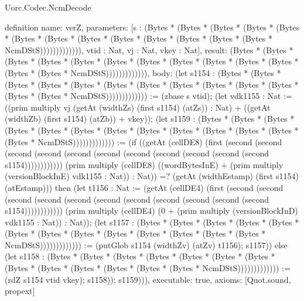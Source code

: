 \begin{lexlean}{Uorc.Codec.NcmDecode}
\begin{semanticmodule}
definition{
  name: verZ,
  parameters: [s : (Bytes * (Bytes * (Bytes * (Bytes * (Bytes * (Bytes * (Bytes * (Bytes * (Bytes * (Bytes * (Bytes * (Bytes * (Bytes * NcmDStS))))))))))))), vtid : Nat, vj : Nat, vkey : Nat],
  result: (Bytes * (Bytes * (Bytes * (Bytes * (Bytes * (Bytes * (Bytes * (Bytes * (Bytes * (Bytes * (Bytes * (Bytes * (Bytes * NcmDStS))))))))))))),
  body: (let s1154 : (Bytes * (Bytes * (Bytes * (Bytes * (Bytes * (Bytes * (Bytes * (Bytes * (Bytes * (Bytes * (Bytes * (Bytes * (Bytes * NcmDStS))))))))))))) := (zbase s vtid); (let vdk1155 : Nat := ((prim multiply vj (getAt (widthZs) (first s1154) (atZs)) : Nat) + ((getAt (widthZb) (first s1154) (atZb)) + vkey)); (let s1159 : (Bytes * (Bytes * (Bytes * (Bytes * (Bytes * (Bytes * (Bytes * (Bytes * (Bytes * (Bytes * (Bytes * (Bytes * (Bytes * NcmDStS))))))))))))) := (if ((getAt (cellDE8) (first (second (second (second (second (second (second (second (second (second (second (second s1154)))))))))))) (prim multiply (cellDE8) ((wordBytesInE) + (prim multiply (versionBlockInE) vdk1155 : Nat)) : Nat)) =? (getAt (widthEstamp) (first s1154) (atEstamp))) then (let t1156 : Nat := (getAt (cellDE4) (first (second (second (second (second (second (second (second (second (second (second (second s1154)))))))))))) (prim multiply (cellDE4) (0 + (prim multiply (versionBlockInD) vdk1155 : Nat)) : Nat)); (let s1157 : (Bytes * (Bytes * (Bytes * (Bytes * (Bytes * (Bytes * (Bytes * (Bytes * (Bytes * (Bytes * (Bytes * (Bytes * (Bytes * NcmDStS))))))))))))) := (putGlob s1154 (widthZv) (atZv) t1156); s1157)) else (let s1158 : (Bytes * (Bytes * (Bytes * (Bytes * (Bytes * (Bytes * (Bytes * (Bytes * (Bytes * (Bytes * (Bytes * (Bytes * (Bytes * NcmDStS))))))))))))) := (rdZ s1154 vtid vkey); s1158)); s1159))),
  executable: true,
  axioms: [Quot.sound, propext]
}


\end{semanticmodule}
\end{lexlean}
